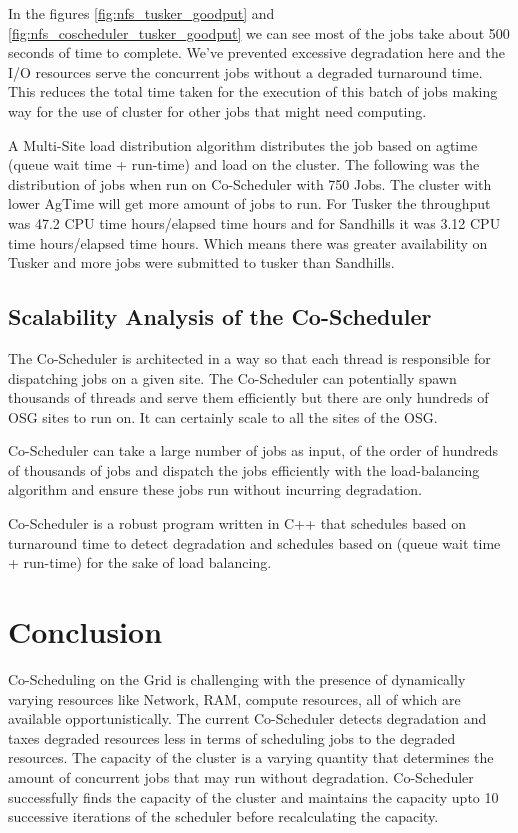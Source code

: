 \documentclass[ms,electronic,double]{nuthesis}
\begin{document}
In the figures \ref{fig:nfs_tusker_goodput} and \ref{fig:nfs_coscheduler_tusker_goodput} we can see most of the jobs take about 
500 seconds of time to complete. We've prevented excessive degradation here and 
the I/O resources serve the concurrent jobs without a degraded turnaround time. 
This reduces the total time taken for the execution of this batch of jobs 
making way for the use of cluster for other jobs that might need computing.

A Multi-Site load distribution algorithm distributes the job based on agtime (queue wait time + run-time) and load on the cluster. The following was the distribution of jobs when run 
on Co-Scheduler with 750 Jobs. The cluster with lower AgTime will get more amount of jobs to run. 
For Tusker the throughput was 47.2 CPU time hours/elapsed time hours and for Sandhills it was 3.12 CPU time hours/elapsed time hours. 
Which means there was greater availability on Tusker and more jobs were 
submitted to tusker than Sandhills.

\section{Scalability Analysis of the Co-Scheduler}

The Co-Scheduler is architected in a way so that each thread is responsible for 
dispatching jobs on a given site. The Co-Scheduler can potentially spawn thousands 
of threads and serve them efficiently but there are only hundreds of OSG sites 
to run on. It can certainly scale to all the sites of the OSG. 

Co-Scheduler can take a large number of jobs as input, of the order of hundreds 
of thousands of jobs and dispatch the jobs efficiently with the load-balancing 
algorithm and ensure these jobs run without incurring degradation.

Co-Scheduler is a robust program written in C++ that schedules based on 
turnaround time to detect degradation and schedules based on  (queue wait time + 
run-time) for the sake of load balancing.

\chapter{Conclusion}

Co-Scheduling on the Grid is challenging with the presence of dynamically varying 
resources like Network, RAM, compute resources, all of which are available opportunistically. 
The current Co-Scheduler 
detects degradation and taxes degraded resources less in terms of scheduling 
jobs to the degraded resources. The capacity of the cluster is a varying 
quantity that determines the amount of concurrent jobs that may run without 
degradation. Co-Scheduler successfully finds the capacity of the cluster and 
maintains the capacity upto 10 successive iterations of the scheduler before 
recalculating the capacity.
\end{document}
